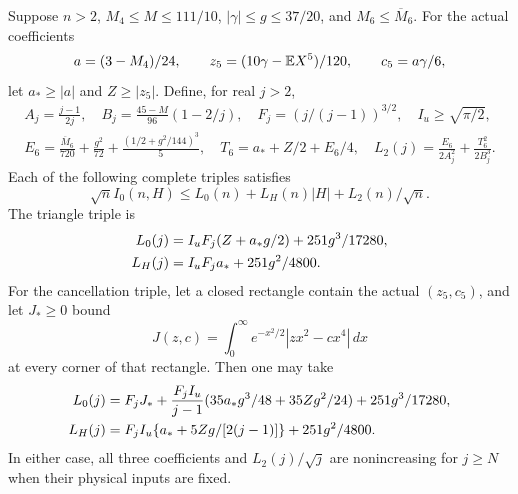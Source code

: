 \begin{lemma}\label{ut:low}
Suppose $n>2$, $M_4\le M\le111/10$, $|\gamma|\le g\le37/20$,
and $M_6\le\overline M_6$. For the actual coefficients
\[
 a=(3-M_4)/24,\qquad z_5=(10\gamma-\mathbb E X^5)/120,
 \qquad c_5=a\gamma/6,
\]
let $a_*\ge|a|$ and $Z\ge|z_5|$. Define, for real $j>2$,
\begin{gather*}
 A_j=\frac{j-1}{2j},\quad B_j=\frac{45-M}{96}(1-2/j),
 \quad F_j=(j/(j-1))^{3/2},\quad I_u\ge\sqrt{\pi/2},\\
 E_6=\frac{\overline M_6}{720}+\frac{g^2}{72}
                  +\frac{(1/2+g^2/144)^3}{5},\quad
 T_6=a_*+Z/2+E_6/4,\quad
 L_2(j)=\frac{E_6}{2A_j^2}+\frac{T_6^2}{2B_j^3}.
\end{gather*}
Each of the following complete triples satisfies
\begin{equation}\label{ut:low-bound}
 \sqrt n I_0(n,H)\le L_0(n)+L_H(n)|H|+L_2(n)/\sqrt n.
\end{equation}
The triangle triple is
\begin{align}\label{ut:triangle}
 L_0(j)&=I_uF_j(Z+a_*g/2)+251g^3/17280,\notag\\
 L_H(j)&=I_uF_j a_*+251g^2/4800.
\end{align}
For the cancellation triple, let a closed rectangle contain the actual
$(z_5,c_5)$, and let $J_*\ge0$ bound
\[
 J(z,c)=\int_0^\infty e^{-x^2/2}|zx^2-cx^4|\,dx
\]
at every corner of that rectangle. Then one may take
\begin{align}\label{ut:paired}
 L_0(j)&=F_jJ_*+\frac{F_jI_u}{j-1}
       (35a_*g^3/48+35Zg^2/24)+251g^3/17280,\notag\\
 L_H(j)&=F_jI_u\{a_*+5Zg/[2(j-1)]\}+251g^2/4800.
\end{align}
In either case, all three coefficients and $L_2(j)/\sqrt j$ are
nonincreasing for $j\ge N$ when their physical inputs are fixed.
\end{lemma}
